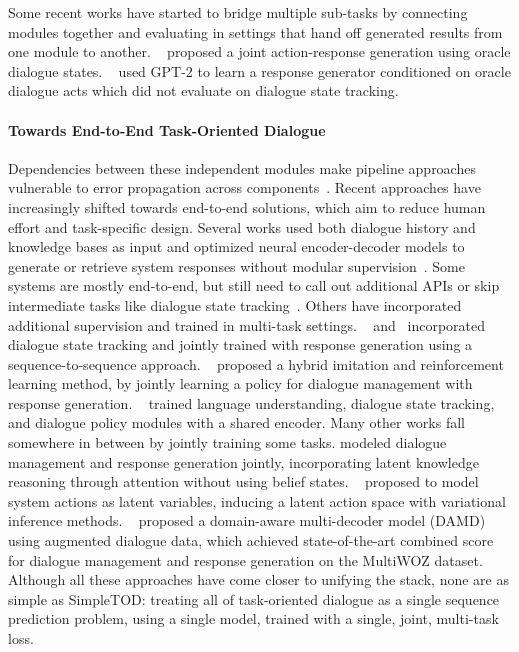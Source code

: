 \documentclass{article}
\begin{document}
Some recent works have started to bridge multiple sub-tasks by connecting modules together 
and evaluating in settings that hand off generated results from one module to another. 
~\citet{HDSA2019chen} proposed a joint action-response generation using oracle dialogue states.
~\citet{peng2020fewshot} used GPT-2 to learn a response generator conditioned on oracle dialogue acts 
which did not evaluate on dialogue state tracking. 



\paragraph{Towards End-to-End Task-Oriented Dialogue}
Dependencies between these independent modules make pipeline approaches vulnerable to error propagation across components~\citep{liu2018dialogue}. 
Recent approaches have increasingly shifted towards end-to-end solutions,
which aim to reduce human effort and task-specific design. 
Several works used both dialogue history and knowledge bases as input and optimized neural encoder-decoder models to generate or retrieve system responses without modular supervision~\citep{eric2017key, zhao2017generative, madotto2018mem2seq, wu2019global, wu2019alternating}.
Some systems are mostly end-to-end, but still need to call out additional APIs or skip intermediate tasks like dialogue state tracking~\citep{bordes2017end2end}.
Others have incorporated additional supervision and trained in multi-task settings.
~\citet{lei2018sequicity} and~\citet{shu2018bsintotod} incorporated dialogue state tracking 
and jointly trained with response generation using a sequence-to-sequence approach.
~\citet{liu2018dialogue} proposed a hybrid imitation and reinforcement learning method, 
by jointly learning a policy for dialogue management with response generation.
~\citet{wen2016network, liang2019moss} trained language understanding, 
dialogue state tracking, 
and dialogue policy modules with a shared encoder.
Many other works fall somewhere in between by jointly training some tasks.
\citet{neelakantan19assistant} modeled dialogue management and response generation jointly, 
incorporating latent knowledge reasoning through attention without using belief states. 
~\citet{zhao2019rethinking} proposed to model system actions as latent variables, inducing a latent action space with variational inference methods. 
~\citet{DAMD2019zhang} proposed a domain-aware multi-decoder model (DAMD) using augmented dialogue data, 
which achieved state-of-the-art combined score for dialogue management and response generation 
on the MultiWOZ dataset.
Although all these approaches have come closer to unifying the stack, 
none are as simple as SimpleTOD: 
treating all of task-oriented dialogue as a single sequence prediction problem, 
using a single model, 
trained with a single, joint, multi-task loss.
\end{document}
